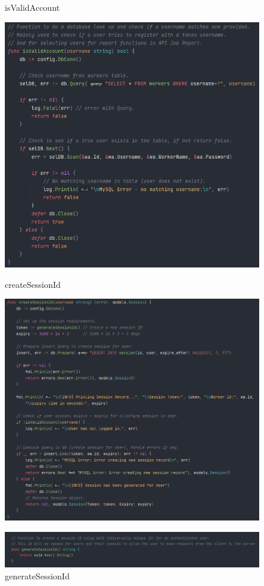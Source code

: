 \begin{figure}[H]
\begin{minipage}[b]{0.6\linewidth}
\end{minipage}
\quad
\begin{minipage}[b]{0.6\linewidth}
    \caption{isValidAccount}
    \label{image:validAccount}
    \includegraphics[width=1.0\textwidth]{images/horton/account_system/valid_account_func.png}
    \caption{createSessionId}
    \label{image:createSession}
    \includegraphics[width=1.0\textwidth]{images/horton/account_system/create_session.png}
    \caption{generateSessionId}
    \label{image:genSession}
    \includegraphics[width=1.0\textwidth]{images/horton/account_system/generate_session.png}
\end{minipage}
\end{figure}
 
